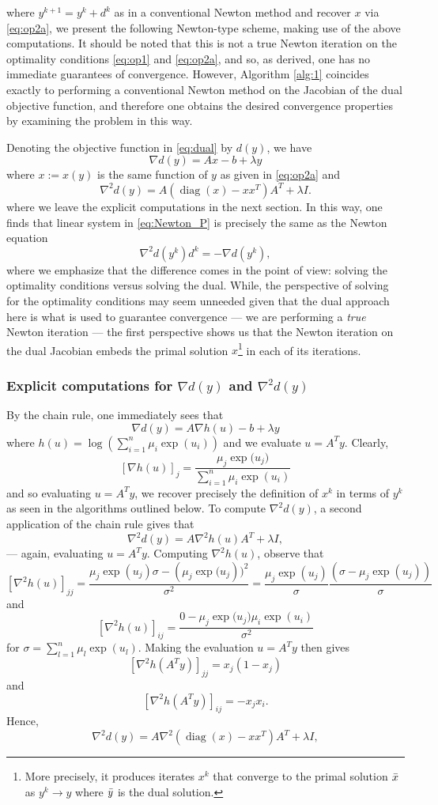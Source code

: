 \documentclass[10pt,a4paper]{article}
\numberwithin{equation}{section}
\theoremstyle{definition}
\DeclareMathOperator{\diag}{diag}
\begin{document}
where $y^{k+1} = y^k + d^k$ as in a conventional Newton method and recover $x$ via \eqref{eq:op2a}, we present the following Newton-type scheme, making use of the above computations. It should be noted that this is not a true Newton iteration on the optimality conditions \eqref{eq:op1} and \eqref{eq:op2a}, and so, as derived, one has no immediate guarantees of convergence. However,  Algorithm \ref{alg:1} coincides exactly to performing a conventional Newton method on the Jacobian of the dual objective function, and therefore one obtains the desired convergence properties by examining the problem in this way. 

Denoting the objective function in \eqref{eq:dual} by $d(y)$, we have 
\[
\nabla d(y) = Ax - b + \lambda y
\]
where $x := x(y)$ is the same function of $y$ as given in \eqref{eq:op2a} and 
\[
\nabla^2 d(y) = A(\diag(x) - xx^T) A^T + \lambda I.
\]
where we leave the explicit computations in the next section. In this way, one finds that linear system in \eqref{eq:Newton_P} is precisely the same as the Newton equation 
\begin{equation}\label{eq:Newton_D}
    \nabla^2 d(y^k)d^k = -\nabla d(y^k),
\end{equation}
where we emphasize that the difference comes in the point of view: solving the optimality conditions versus solving the dual. While, the perspective of solving for the optimality conditions may seem unneeded given that the dual approach here is what is used to guarantee convergence --- we are performing a \emph{true} Newton iteration --- the first perspective shows us that the Newton iteration on the dual Jacobian embeds the primal solution $x$\footnote{More precisely, it produces iterates $x^k$ that converge to the primal solution $\Bar{x}$ as $y^k \to y$ where $\Bar{y}$ is the dual solution.} in each of its iterations.

\subsubsection{Explicit computations for $\nabla d(y)$ and $\nabla^2d(y)$}

By the chain rule, one immediately sees that
\[
\nabla d(y) = A\nabla h(u) - b + \lambda y
\]
where $h(u) = \log (\sum_{i=1}^n \mu_i \exp{(u_i)})$ and we evaluate $u = A^Ty$. Clearly, 
\[
[\nabla h(u)]_j = \frac{\mu_j \exp{(u_j})}{\sum_{i=1}^n \mu_i \exp{(u_i)}}
\]
and so evaluating $u = A^Ty$, we recover precisely the definition of $x^k$ in terms of $y^k$ as seen in the algorithms outlined below. To compute $\nabla^2 d(y)$, a second application of the chain rule gives that
\[
\nabla^2 d(y) = A \nabla^2 h(u) A^T + \lambda I,
\]
--- again, evaluating $u = A^Ty$. Computing $\nabla^2 h(u)$, observe that
\[
[\nabla^2 h(u)]_{jj} = \frac{\mu_j \exp{(u_j)}\sigma - (\mu_j \exp{(u_j}))^2}{\sigma^2} = \frac{\mu_j \exp(u_j)}{\sigma} \frac{(\sigma - \mu_j \exp{(u_j)})}{\sigma}
\]
and
\[
[\nabla^2 h(u)]_{ij} = \frac{0 - \mu_j \exp{(u_j})\mu_i \exp{(u_i)}}{\sigma^2} 
\]
for $\sigma = \sum_{l=1}^n \mu_l \exp{(u_l)}$. Making the evaluation $u = A^Ty$ then gives
\[
[\nabla^2 h(A^Ty)]_{jj} = x_j(1 - x_j)
\]
and 
\[
[\nabla^2 h(A^Ty)]_{ij} = -x_jx_i.
\]
Hence, 
\[
\nabla^2 d(y) = A \nabla^2(\diag(x) - xx^T) A^T + \lambda I,
\]
\end{document}

